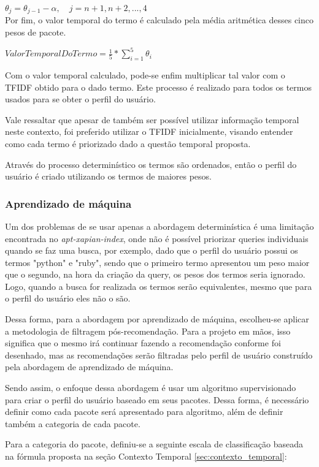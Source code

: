 $\theta_j = \theta_{j-1} - \alpha , \quad j = n+1, n+2, ..., 4$
\\

Por fim, o valor temporal do termo é calculado pela média aritmética desses
cinco pesos de pacote.

$ValorTemporalDoTermo = \frac{1}{5} * \sum\limits_{i=1}^{5} \theta_i$

Com o valor temporal calculado, pode-se enfim multiplicar tal valor com o TFIDF
obtido para o dado termo. Este processo é realizado para todos os termos usados
para se obter o perfil do usuário.

Vale ressaltar que apesar de também ser possível utilizar informação temporal
neste contexto, foi preferido utilizar o TFIDF inicialmente, visando entender
como cada termo é priorizado dado a questão temporal proposta.

Através do processo determinístico os termos são ordenados, então o perfil
do usuário é criado utilizando os termos de maiores pesos.

\subsubsection{Aprendizado de máquina}

Um dos problemas de se usar apenas a abordagem determinística é uma limitação
encontrada no \textit{apt-xapian-index}, onde não é possível priorizar queries
individuais quando se faz uma busca, por exemplo, dado que o perfil
do usuário possui os termos "python" e "ruby", sendo que o primeiro termo
apresentou um peso maior que o segundo, na hora da criação da query, os pesos
dos termos seria ignorado. Logo, quando a busca for realizada os termos serão
equivalentes, mesmo que para o perfil do usuário eles não o são.

Dessa forma, para a abordagem por aprendizado de máquina, escolheu-se aplicar a
metodologia de filtragem pós-recomendação. Para a projeto em mãos, isso
significa que o mesmo irá continuar fazendo a recomendação conforme foi
desenhado, mas as recomendações serão filtradas pelo perfil de usuário
construído pela abordagem de aprendizado de máquina.

Sendo assim, o enfoque dessa abordagem é usar um algoritmo supervisionado
para criar o perfil do usuário baseado em seus pacotes. Dessa forma, é
necessário definir como cada pacote será apresentado para algoritmo, além de
definir também a categoria de cada pacote.

Para a categoria do pacote, definiu-se a seguinte escala de classificação baseada na
fórmula proposta na seção Contexto Temporal \ref{sec:contexto_temporal}:

